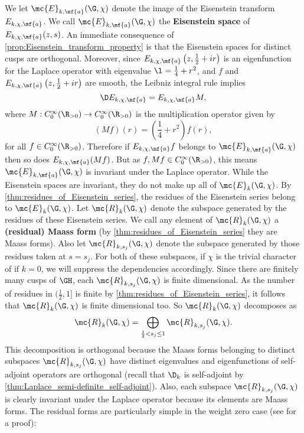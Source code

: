     We let $\mc{E}_{k,\mf{a}}(\G,\chi)$ denote the image of the Eisenstein transform $E_{k,\chi,\mf{a}}$. We call $\mc{E}_{k,\mf{a}}(\G,\chi)$ the \textbf{Eisenstein space} of $E_{k,\chi,\mf{a}}(z,s)$. An immediate consequence of \cref{prop:Eisenstein_transform_property} is that the Eisenstein spaces for distinct cusps are orthogonal. Moreover, since $E_{k,\chi,\mf{a}}\left(z,\frac{1}{2}+ir\right)$ is an eigenfunction for the Laplace operator with eigenvalue $\l = \frac{1}{4}+r^{2}$, and $f$ and $E_{k,\chi,\mf{a}}\left(z,\frac{1}{2}+ir\right)$ are smooth, the Leibniz integral rule implies
    \[
      \D E_{k,\chi,\mf{a}}= E_{k,\chi,\mf{a}}M,
    \]
    where $M:C_{0}^{\infty}(\R_{> 0}) \to C_{0}^{\infty}(\R_{> 0})$ is the multiplication operator given by
    \[
      (Mf)(r) = \left(\frac{1}{4}+r^{2}\right)f(r),
    \]
    for all $f \in C_{0}^{\infty}(\R_{> 0})$. Therefore if $E_{k,\chi,\mf{a}}f$ belongs to $\mc{E}_{k,\mf{a}}(\G,\chi)$ then so does $E_{k,\chi,\mf{a}}(Mf)$. But as $f,Mf \in C_{0}^{\infty}(\R_{> 0})$, this means $\mc{E}_{k,\mf{a}}(\G,\chi)$ is invariant under the Laplace operator. While the Eisenstein spaces are invariant, they do not make up all of $\mc{E}_{k}(\G,\chi)$. By \cref{thm:residues_of_Eisenstein_series}, the residues of the Eisenstein series belong to $\mc{E}_{k}(\G,\chi)$. Let $\mc{R}_{k}(\G,\chi)$ denote the subspace generated by the residues of these Eisenstein series. We call any element of $\mc{R}_{k}(\G,\chi)$ a \textbf{(residual) Maass form} (by \cref{thm:residues_of_Eisenstein_series} they are Maass forms). Also let $\mc{R}_{k,s_{j}}(\G,\chi)$ denote the subspace generated by those residues taken at $s = s_{j}$. For both of these subspaces, if $\chi$ is the trivial character of if $k = 0$, we will suppress the dependencies accordingly. Since there are finitely many cusps of $\GH$, each $\mc{R}_{k,s_{j}}(\G,\chi)$ is finite dimensional. As the number of residues in $(\frac{1}{2},1]$ is finite by \cref{thm:residues_of_Eisenstein_series}, it follows that $\mc{R}_{k}(\G,\chi)$ is finite dimensional too. So $\mc{R}_{k}(\G,\chi)$ decomposes as
    \[
      \mc{R}_{k}(\G,\chi) = \bigoplus_{\frac{1}{2} < s_{j} \le 1}\mc{R}_{k,s_{j}}(\G,\chi).
    \]
    This decomposition is orthogonal because the Maass forms belonging to distinct subspaces $\mc{R}_{k,s_{j}}(\G,\chi)$ have distinct eigenvalues and eigenfunctions of self-adjoint operators are orthogonal (recall that $\D_{k}$ is self-adjoint by \cref{thm:Laplace_semi-definite_self-adjoint}). Also, each subspace $\mc{R}_{k,s_{j}}(\G,\chi)$ is clearly invariant under the Laplace operator because its elements are Maass forms. The residual forms are particularly simple in the weight zero case (see \cite{iwaniec2002spectral} for a proof):

